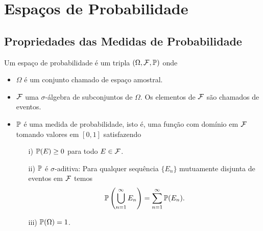 \chapter[Aula 4]{Espaços de Probabilidade}
\chaptermark{}





\section{Propriedades das Medidas de Probabilidade}

Um espaço de probabilidade é um tripla 
$(\Omega,\F,\P)$ onde 
\begin{itemize}
	\item 
	$\Omega$ é um conjunto chamado de espaço amostral.

	\item
	$\F$ uma $\sigma$-álgebra de subconjuntos de $\Omega$.
	Os elementos de $\F$ são chamados de eventos.
	
	\item $\P$ é uma medida de probabilidade, isto é, 
	uma função com domínio em $\F$ tomando valores em 
	$[0,1]$ satisfazendo 
		\begin{itemize}
			\item[i)] 
			$\P(E)\geq 0$ para todo $E\in \F$.

			\item[ii)] 
			$\P$ é $\sigma$-aditiva: Para qualquer
			sequência $\{E_n\}$ mutuamente disjunta 
			de eventos em $\F$ temos 
				\[
					\P\left( \bigcup_{n=1}^{\infty} E_n \right)
					=
					\sum_{n=1}^{\infty} \P(E_n).
				\]
			\item[iii)] 
			$\P(\Omega)=1$.
		\end{itemize}
\end{itemize}



